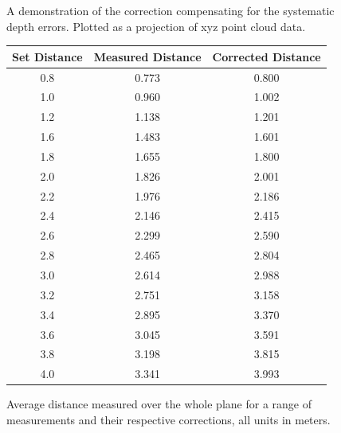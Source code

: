 \documentclass[]{article}
\begin{document}
{\begin{figure}[htb]
	\caption{A demonstration of the correction compensating for the systematic depth errors. Plotted as a projection of xyz point cloud data.}
	\label{fig:outputTest}
\end{figure}

\begin{figure}[htb]
	\begin{center}
	\begin{tabular}{ccc}
		\hline

		\hline
		\textbf{Set Distance}& \textbf{Measured Distance}& \textbf{Corrected Distance} \\
		\hline
		0.8		& 0.773	& 0.800\\
		1.0		& 0.960	& 1.002\\
		1.2 	& 1.138	& 1.201\\
		1.6 	& 1.483	& 1.601\\
		1.8 	& 1.655	& 1.800\\
		2.0 	& 1.826	& 2.001\\
		2.2 	& 1.976	& 2.186\\
		2.4 	& 2.146	& 2.415\\
		2.6 	& 2.299	& 2.590\\
		2.8 	& 2.465	& 2.804\\
		3.0 	& 2.614	& 2.988\\
		3.2 	& 2.751	& 3.158\\
		3.4 	& 2.895	& 3.370\\
		3.6 	& 3.045	& 3.591\\
		3.8 	& 3.198	& 3.815\\
		4.0 	& 3.341	& 3.993\\
		\hline

		\hline
	\end{tabular}
	\end{center}
	\caption{Average distance measured over the whole plane for a range of measurements and their respective corrections, all units in meters.}
	\label{tab:averages}
\end{figure}


}
\end{document}
